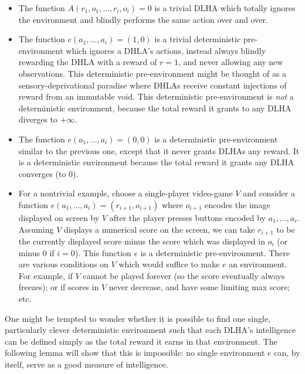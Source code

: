 \documentclass[twoside,11pt]{article}
\begin{document}
\begin{example}
    \begin{itemize}
        \item The function $A(r_1,o_1,\ldots,r_i,o_i)=0$ is a trivial DLHA which
        totally ignores the environment and blindly performs the same action
        over and over.
        \item The function $e(a_1,\ldots,a_i)=(1,0)$ is a trivial deterministic pre-environment
        which ignores a DHLA's actions, instead always blindly rewarding the DHLA
        with a reward of $r=1$, and never allowing any new observations. This
        deterministic pre-environment might be thought of as a sensory-deprivational paradise
        where DHLAs receive constant injections of reward from an immutable void.
        This deterministic pre-environment
        is \emph{not} a deterministic environment, because the total reward
        it grants to any DLHA diverges to $+\infty$.
        \item The function $e(a_1,\ldots,a_i)=(0,0)$ is a deterministic
        pre-environment similar to
        the previous one, except that it never grants DLHAs any reward. It is a
        deterministic environment because the total reward it grants
        any DLHA converges (to $0$).
        \item For a nontrivial example, choose a single-player video-game $V$ and 
        consider a function $e(a_1,\ldots,a_i)=(r_{i+1},o_{i+1})$
        where $o_{i+1}$ encodes the image displayed on screen
        by $V$ after the player presses buttons encoded by $a_1,\ldots,a_i$.
        Assuming $V$ displays a numerical score on the screen,
        we can take $r_{i+1}$ to be the currently displayed score minus the score which was
        displayed in $o_i$ (or minus $0$
        if $i=0$). This function $e$ is a deterministic pre-environment. There are various
        conditions on $V$ which would suffice to make $e$ an environment. For example,
        if $V$ cannot be played forever (so the score eventually always freezes);
        or if scores in $V$ never decrease, and have some limiting max score;
        etc.
    \end{itemize}
\end{example}

One might be tempted to wonder whether it is possible to find one single, particularly
clever deterministic environment such that each DLHA's intelligence can be defined
simply as the total reward it earns in that environment. The following lemma will show
that this is impossible: no single environment $e$ can, by itself, serve as a good
measure of intelligence.
\end{document}
